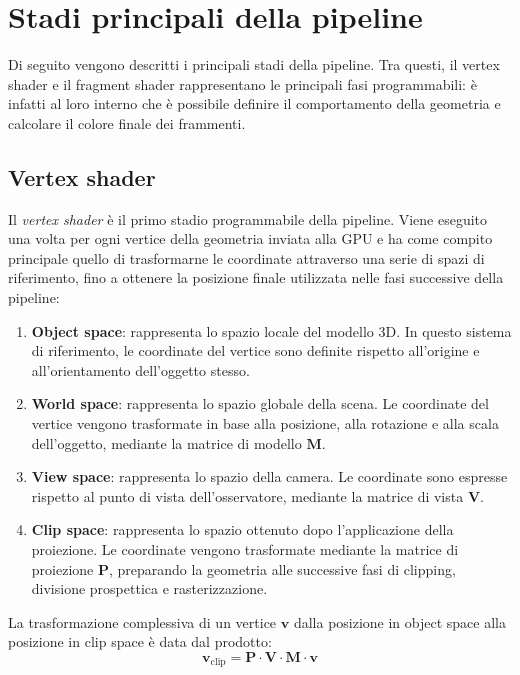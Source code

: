 \documentclass[12pt,a4paper,twoside]{book}
\begin{document}
\section{Stadi principali della pipeline}
\label{sec:pipeline-stages}

Di seguito vengono descritti i principali stadi della pipeline. Tra questi, il vertex shader e il fragment shader rappresentano le principali fasi programmabili: è infatti al loro interno che è possibile definire il comportamento della geometria e calcolare il colore finale dei frammenti.

\subsection{Vertex shader}
\label{subsec:vertex-shader}

Il \textit{vertex shader} è il primo stadio programmabile della pipeline. Viene eseguito una volta per ogni vertice della geometria inviata alla GPU e ha come compito principale quello di trasformarne le coordinate attraverso una serie di spazi di riferimento, fino a ottenere la posizione finale utilizzata nelle fasi successive della pipeline:

\begin{enumerate}
    \item \textbf{Object space}: rappresenta lo spazio locale del modello 3D. In questo sistema di riferimento, le coordinate del vertice sono definite rispetto all'origine e all'orientamento dell'oggetto stesso.
    \item \textbf{World space}: rappresenta lo spazio globale della scena. Le coordinate del vertice vengono trasformate in base alla posizione, alla rotazione e alla scala dell'oggetto, mediante la matrice di modello $\mathbf{M}$.
    \item \textbf{View space}: rappresenta lo spazio della camera. Le coordinate sono espresse rispetto al punto di vista dell'osservatore, mediante la matrice di vista $\mathbf{V}$.
    \item \textbf{Clip space}: rappresenta lo spazio ottenuto dopo l'applicazione della proiezione. Le coordinate vengono trasformate mediante la matrice di proiezione $\mathbf{P}$, preparando la geometria alle successive fasi di clipping, divisione prospettica e rasterizzazione.
\end{enumerate}

La trasformazione complessiva di un vertice $\mathbf{v}$ dalla posizione in object space alla posizione in clip space è data dal prodotto:
\begin{equation}
    \mathbf{v}_{\text{clip}} = \mathbf{P} \cdot \mathbf{V} \cdot \mathbf{M} \cdot \mathbf{v}
    \label{eq:mvp}
\end{equation}
\end{document}
